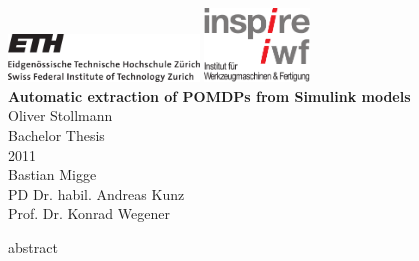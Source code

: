 \documentclass[paper=a4,twoside=true,fontsize=11pt,numbers=noendperiod,chapterprefix=false]{scrbook}
\begin{document}
\begin{titlepage}
	\topmargin -3.8cm
	\oddsidemargin 0.0cm
	\evensidemargin 0.0cm
	\centering
	\includegraphics*[width=0.38\textwidth]{media/ETH_logo} \hfill
	\includegraphics*[width=0.21\textwidth]{media/logo_inspire_iwf} \\
	\vspace{8.2cm}
	\Huge
	\textbf{\textsf{Automatic extraction of POMDPs from Simulink models}} \\[2.0cm]
	\vspace{2.0cm}
	\sffamily
	\Large
	Oliver Stollmann
	\\[0.8cm]
	\large
	Bachelor Thesis
	\\
	2011
	\\[0.8cm] %
	Bastian Migge
	\\
	PD Dr. habil. Andreas Kunz
	\\[0.5cm]
	Prof. Dr. Konrad Wegener
	\vfill
\end{titlepage}
\clearemptydoublepage

\setcounter{page}{1}

{abstract}

\cleardoublepage

\cleardoublepage
\end{document}
